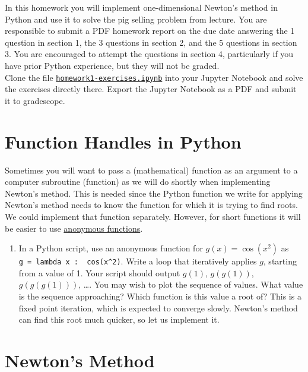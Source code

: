 \documentclass[letter]{article}
\newcommand{\setheader}[6]{
	\lhead{{\sc #1}\\{\sc #2}}%
	\rhead{
		{\bf #3} 
		\ifthenelse{\equal{#4}{}}{}{(#4)}\\
		{\bf #5} 
		\ifthenelse{\equal{#6}{}}{}{(#6)}%
	}
}
\begin{document}
	\setheader{APM348}{Homework 1}{Due: 11:59pm January 26}{}{}{}

In this homework you will implement one-dimensional Newton's method in Python and use it to solve the pig selling problem from lecture. You are responsible to submit a PDF homework report on the due date answering the 1 question in section 1, the 3 questions in section 2, and the 5 questions in section 3. You are encouraged to attempt the questions in section 4, particularly if you have prior Python experience, but they will not be graded. \\

Clone the file \href{https://utoronto.syzygy.ca/jupyter/user-redirect/git-pull?repo=https://github.com/bigfatbernie/IBLMathModeling&subPath=homeworks/homework1/homework1-exercises.ipynb}{\tt homework1-exercises.ipynb} into your Jupyter Notebook and solve the exercises directly there.
Export the Jupyter Notebook as a PDF and submit it to gradescope.


\section{Function Handles in Python}

Sometimes you will want to pass a (mathematical) function as an argument to a computer subroutine (function) as we will do shortly when implementing Newton's method. This is needed since the Python function we write for applying Newton's method needs to know the function for which it is trying to find roots. We could implement that function separately. However, for short functions it will be easier to use \href{https://www.w3schools.com/python/python_lambda.asp}{anonymous functions}.

\begin{enumerate}
\item In a Python script, use an anonymous function for $g(x) = \cos(x^2)$ as \\\verb|g = lambda x :  cos(x^2)|. Write a loop that iteratively applies $g$, starting from a value of 1. Your script should output $g(1)$, $g(g(1))$, $g(g(g(1)))$, \ldots . You may wish to plot the sequence of values. What value is the sequence approaching? Which function is this value a root of? This is a fixed point iteration, which is expected to converge slowly. Newton's method can find this root much quicker, so let us implement it.
\end{enumerate}

\section{Newton's Method}
\end{document}
